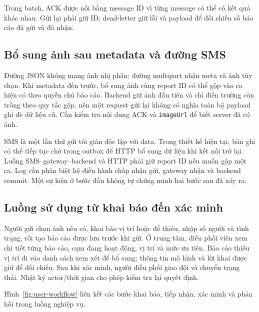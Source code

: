 Trong batch, ACK được nối bằng message ID vì từng message có thể có kết quả khác nhau. Gửi lại phải giữ ID; dead-letter giữ lỗi và payload để đối chiếu số báo cáo đã gửi và đã nhận.

\subsection{Bổ sung ảnh sau metadata và đường SMS}
Đường JSON không mang ảnh nhị phân; đường multipart nhận meta và ảnh tùy chọn. Khi metadata đến trước, bổ sung ảnh cùng report ID có thể gộp vào ca hiện có theo quyền chủ báo cáo. Backend giữ ảnh đầu tiên và chỉ điền trường còn trống theo quy tắc gộp, nên một request gửi lại không có nghĩa toàn bộ payload ghi đè dữ liệu cũ. Cần kiểm tra nội dung ACK và \texttt{imageUrl} để biết server đã có ảnh.

SMS là một lần thử gửi tối giản độc lập với data. Trong thiết kế hiện tại, bản ghi có thể tiếp tục chờ trong outbox để HTTP bổ sung dữ liệu khi kết nối trở lại. Luồng SMS--gateway--backend và HTTP phải giữ report ID nếu muốn gộp một ca. Log cần phân biệt hệ điều hành chấp nhận gửi, gateway nhận và backend commit. Một sự kiện ở bước đầu không tự chứng minh hai bước sau đã xảy ra.

\subsection{Luồng sử dụng từ khai báo đến xác minh}
Người gửi chọn ảnh nếu có, khai báo vị trí hoặc để thiếu, nhập số người và tình trạng, rồi tạo báo cáo được lưu trước khi gửi. Ở trung tâm, điều phối viên xem chi tiết từng báo cáo, cụm đang hoạt động, vị trí và mức ưu tiên. Báo cáo thiếu vị trí đi vào danh sách xem xét để bổ sung; thông tin mô hình và lời khai được giữ để đối chiếu. Sau khi xác minh, người điều phối giao đội và chuyển trạng thái. Nhật ký actor/thời gian cho phép kiểm tra lại quyết định.

Hình~\ref{fig:user-workflow} liên kết các bước khai báo, tiếp nhận, xác minh và phản hồi trong luồng nghiệp vụ.

